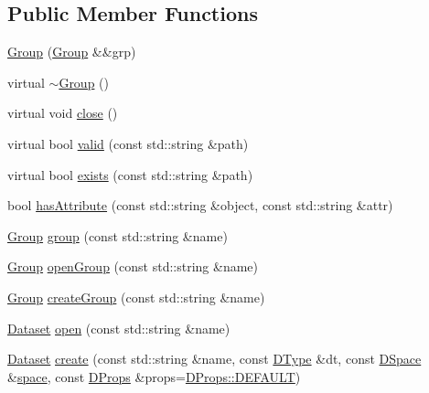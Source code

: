 \subsection*{Public Member Functions}
\begin{DoxyCompactItemize}
\item 
\hyperlink{class_h5_t_l_1_1_group_a21fb4c34f51a8a56817f5a8ea1c8b9f3}{Group} (\hyperlink{class_h5_t_l_1_1_group}{Group} \&\&grp)
\item 
virtual \hyperlink{class_h5_t_l_1_1_group_a373048dcbc38705ab6439b7eb7d66a7e}{$\sim$\-Group} ()
\item 
virtual void \hyperlink{class_h5_t_l_1_1_group_a33879ce41734238eb50b6917268d279d}{close} ()
\item 
virtual bool \hyperlink{class_h5_t_l_1_1_group_ab4fbf0c28300b542e2279f5e85fb641f}{valid} (const std\-::string \&path)
\item 
virtual bool \hyperlink{class_h5_t_l_1_1_group_abbf255a903c6a9c5a5dcb33660ce0370}{exists} (const std\-::string \&path)
\item 
bool \hyperlink{class_h5_t_l_1_1_group_a7f928985e0131b63c21764136bf1a01d}{has\-Attribute} (const std\-::string \&object, const std\-::string \&attr)
\item 
\hyperlink{class_h5_t_l_1_1_group}{Group} \hyperlink{class_h5_t_l_1_1_group_ac40bee3d18aed5cc150ec47d61554ef3}{group} (const std\-::string \&name)
\item 
\hyperlink{class_h5_t_l_1_1_group}{Group} \hyperlink{class_h5_t_l_1_1_group_a84745fdcd43c75880ca4cd1e064e4ac9}{open\-Group} (const std\-::string \&name)
\item 
\hyperlink{class_h5_t_l_1_1_group}{Group} \hyperlink{class_h5_t_l_1_1_group_ab6faa3a0b9c6f9358130e1e5e4a08ad1}{create\-Group} (const std\-::string \&name)
\item 
\hyperlink{class_h5_t_l_1_1_dataset}{Dataset} \hyperlink{class_h5_t_l_1_1_group_a3bc589843f86da0a0e3c7c0382c47188}{open} (const std\-::string \&name)
\item 
\hyperlink{class_h5_t_l_1_1_dataset}{Dataset} \hyperlink{class_h5_t_l_1_1_group_aa894ff509b260d0c5d68a765a5940da9}{create} (const std\-::string \&name, const \hyperlink{class_h5_t_l_1_1_d_type}{D\-Type} \&dt, const \hyperlink{class_h5_t_l_1_1_d_space}{D\-Space} \&\hyperlink{namespace_h5_t_l_ae09d3a5b75f86dad261e807592fee081}{space}, const \hyperlink{class_h5_t_l_1_1_d_props}{D\-Props} \&props=\hyperlink{class_h5_t_l_1_1_d_props_a92db9269544c73f48d72be1db4256107}{D\-Props\-::\-D\-E\-F\-A\-U\-L\-T})
\item 

\end{DoxyCompactItemize}
